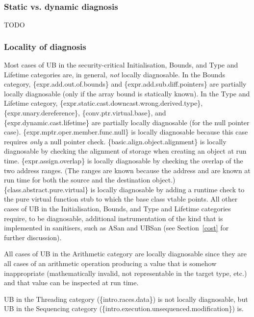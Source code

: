 \subsubsection{Static vs. dynamic diagnosis}
\label{statically}

TODO

\subsubsection{Locality of diagnosis}
\label{locally}


Most cases of UB in the security-critical Initialisation, Bounds, and Type and Lifetime categories are, in general, \emph{not} locally diagnosable.  In the Bounds category, 
\{expr.add.out.of.bounds\} 
and \{expr.add.sub.diff.pointers\} 
are partially locally diagnosable (only if the array bound is statically known). In the Type and Lifetime category,
\{expr.static.cast.downcast.wrong.derived.type\},
\{expr.unary.dereference\}, 
\{conv.ptr.virtual.base\}, and
\{expr.dynamic.cast.lifetime\}
are partially locally diagnosable (for the null pointer case).
\{expr.mptr.oper.member.func.null\} is locally diagnosable because this case requires \emph{only} a null pointer check.
\{basic.align.object.alignment\} is locally diagnosable by checking the alignment of storage when creating an object at run time.
\{expr.assign.overlap\} is locally diagnosable by checking the overlap of the two address ranges. (The ranges are known because the address and  are known at run time for both the source and the destination object.) \{class.abstract.pure.virtual\} is locally diagnosable by adding a runtime check to  the pure virtual function stub to which the base class vtable points. All other cases of UB in the Initialisation, Bounds, and Type and Lifetime categories require, to be diagnosable, additional instrumentation of the kind that is implemented in sanitisers, such as ASan and UBSan (see Section~\ref{cost} for further discussion).

All cases of UB in the Arithmetic category are locally diagnosable since they are all cases of an arithmetic operation producing a value that is somehow inappropriate (mathematically invalid, not representable in the target type, etc.) and that value can be inspected at run time.

UB in the Threading category (\{intro.races.data\}) is not locally diagnosable, but UB in the Sequencing category (\{intro.execution.unsequenced.modification\}) is. 

